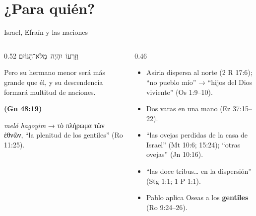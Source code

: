 \documentclass[hyperref={bookmarks=false},aspectratio=169]{beamer}
\newcommand{\heb}[1]{\mbox{\foreignlanguage{hebrew}{#1}}}
\newcommand{\grc}[1]{\foreignlanguage{ancientgreek}{#1}}
\newcommand{\fuente}[1]{\par\hfill{\upshape\bfseries\footnotesize\textcolor{tierraroja}{#1}}}
\newcommand{\destacar}[1]{\textbf{\textcolor{tierraroja}{#1}}}
\begin{document}
\section{¿Para quién?}

\begin{frame}{Israel, Efraín y las naciones}
\begin{columns}[c,onlytextwidth]
\begin{column}{0.52\textwidth}
\centering\scriptsize\heb{וְזַרְעוֹ יִהְיֶה מְלֹא־הַגּוֹיִם}
\begin{cita}Pero su hermano menor será más grande que él, y su descendencia formará multitud de naciones.\fuente{(Gn 48:19)}\end{cita}
\scriptsize \emph{meló hagoyim} → \grc{τὸ πλήρωμα τῶν ἐθνῶν}, ``la plenitud de los gentiles'' (Ro 11:25).
\end{column}
\begin{column}{0.46\textwidth}\scriptsize
\begin{itemize}
\item Asiria dispersa al norte (2 R 17:6); ``no pueblo mío'' → ``hijos del Dios viviente'' (Os 1:9--10).
\item Dos varas en una mano (Ez 37:15--22).
\item ``las ovejas perdidas de la casa de Israel'' (Mt 10:6; 15:24); ``otras ovejas'' (Jn 10:16).
\item ``las doce tribus\ldots{} en la dispersión'' (Stg 1:1; 1 P 1:1).
\item Pablo aplica Oseas a los \destacar{gentiles} (Ro 9:24--26).
\end{itemize}
\end{column}
\end{columns}
\end{frame}
\end{document}
